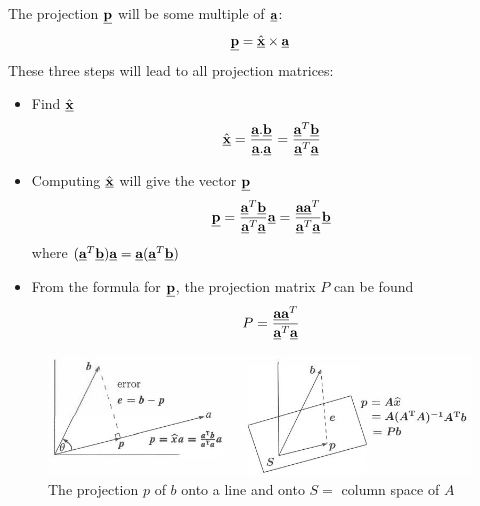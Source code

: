\documentclass[10pt,a4paper]{article}
\begin{document}
The projection $\textbf{\underline{p}}$ will be some multiple of $\textbf{\underline{a}}$:
\begin{align*}
    \textbf{\underline{p}} = \hat{\textbf{\underline{x}}} \times \textbf{\underline{a}}
\end{align*}    
These three steps will lead to all projection matrices: 
\begin{itemize}
    \item Find $\hat{\textbf{\underline{x}}}$
    \begin{align*}
        \hat{\textbf{\underline{x}}} = \frac{\textbf{\underline{a}}.\textbf{\underline{b}}}{\textbf{\underline{a}}.\textbf{\underline{a}}} = \frac{\textbf{\underline{a}}^T \textbf{\underline{b}}}{\textbf{\underline{a}}^T \textbf{\underline{a}}}
    \end{align*}
    \item Computing $\hat{\textbf{\underline{x}}}$ will give the vector $\textbf{\underline{p}}$
    \begin{align*}
        \textbf{\underline{p}} = \frac{\textbf{\underline{a}}^T \textbf{\underline{b}}}{\textbf{\underline{a}}^T \textbf{\underline{a}}} \textbf{\underline{a}} = \frac{\textbf{\underline{a}} \textbf{\underline{a}}^T}{\textbf{\underline{a}}^T \textbf{\underline{a}}} \textbf{\underline{b}} 
    \end{align*}
    where $(\textbf{\underline{a}}^T \textbf{\underline{b}})\textbf{\underline{a}}=\textbf{\underline{a}}(\textbf{\underline{a}}^T\textbf{\underline{b}})$
    \item From the formula for $\textbf{\underline{p}}$, the projection matrix $P$ can be found
    \begin{align*}
        P = \frac{\textbf{\underline{a}} \textbf{\underline{a}}^T}{\textbf{\underline{a}}^T \textbf{\underline{a}}}
    \end{align*}
\end{itemize}
\begin{figure} [h!]
    \centering
    \includegraphics[scale=0.6]{proj.JPG}
    \caption{The projection $p$ of $b$ onto a line and onto $S =$ column space of $A$}
\end{figure}
\end{document}
